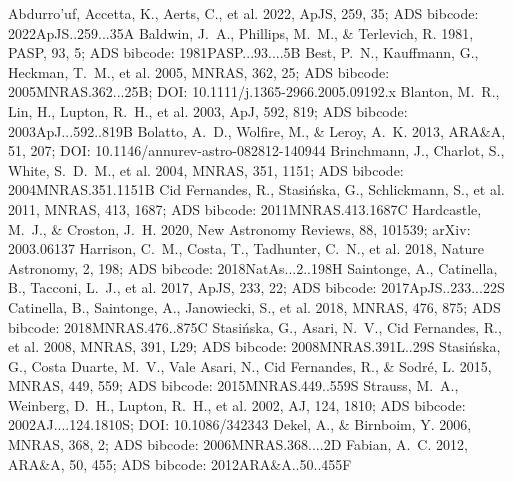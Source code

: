 \documentclass[twocolumn]{aastex631}
\begin{document}

\begin{thebibliography}{}
 Abdurro'uf, Accetta, K., Aerts, C., et al. 2022, ApJS, 259, 35; ADS bibcode: 2022ApJS..259...35A
 Baldwin, J.~A., Phillips, M.~M., \& Terlevich, R. 1981, PASP, 93, 5; ADS bibcode: 1981PASP...93....5B
 Best, P.~N., Kauffmann, G., Heckman, T.~M., et al. 2005, MNRAS, 362, 25; ADS bibcode: 2005MNRAS.362...25B; DOI: 10.1111/j.1365-2966.2005.09192.x
 Blanton, M.~R., Lin, H., Lupton, R.~H., et al. 2003, ApJ, 592, 819; ADS bibcode: 2003ApJ...592..819B
 Bolatto, A.~D., Wolfire, M., \& Leroy, A.~K. 2013, ARA\&A, 51, 207; DOI: 10.1146/annurev-astro-082812-140944
 Brinchmann, J., Charlot, S., White, S.~D.~M., et al. 2004, MNRAS, 351, 1151; ADS bibcode: 2004MNRAS.351.1151B
 Cid Fernandes, R., Stasi{\'n}ska, G., Schlickmann, S., et al. 2011, MNRAS, 413, 1687; ADS bibcode: 2011MNRAS.413.1687C
 Hardcastle, M.~J., \& Croston, J.~H. 2020, New Astronomy Reviews, 88, 101539; arXiv: 2003.06137
 Harrison, C.~M., Costa, T., Tadhunter, C.~N., et al. 2018, Nature Astronomy, 2, 198; ADS bibcode: 2018NatAs...2..198H
 Saintonge, A., Catinella, B., Tacconi, L.~J., et al. 2017, ApJS, 233, 22; ADS bibcode: 2017ApJS..233...22S
 Catinella, B., Saintonge, A., Janowiecki, S., et al. 2018, MNRAS, 476, 875; ADS bibcode: 2018MNRAS.476..875C
 Stasi{\'n}ska, G., Asari, N.~V., Cid Fernandes, R., et al. 2008, MNRAS, 391, L29; ADS bibcode: 2008MNRAS.391L..29S
 Stasi{\'n}ska, G., Costa Duarte, M.~V., Vale Asari, N., Cid Fernandes, R., \& Sodr{\'e}, L. 2015, MNRAS, 449, 559; ADS bibcode: 2015MNRAS.449..559S
 Strauss, M.~A., Weinberg, D.~H., Lupton, R.~H., et al. 2002, AJ, 124, 1810; ADS bibcode: 2002AJ....124.1810S; DOI: 10.1086/342343
 Dekel, A., \& Birnboim, Y. 2006, MNRAS, 368, 2; ADS bibcode: 2006MNRAS.368....2D
 Fabian, A.~C. 2012, ARA\&A, 50, 455; ADS bibcode: 2012ARA\&A..50..455F

\end{thebibliography}
\end{document}
